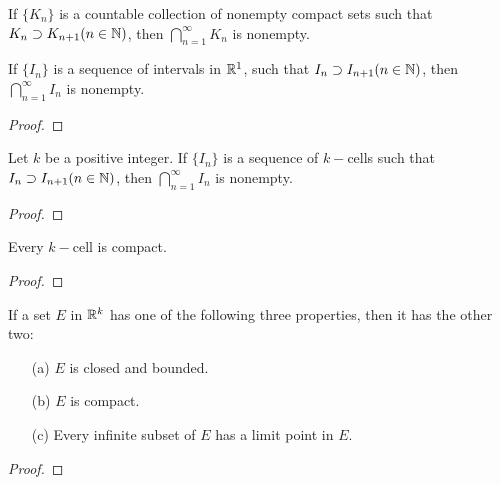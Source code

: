 \documentclass[11pt,a4paper]{book}
\begin{document}
\begin{corollary}
    If \( \{ {K}_{n} \}   \) is a countable collection of nonempty compact sets such that \( {K}_{n} \supset {K}_{n+1} (n \in \mathbb{N}) \), then \( \bigcap_{ n=1  }^{ \infty  } {K}_{n} \) is nonempty.
\end{corollary}

\begin{theorem}[ ]
    If \( \{ {I}_{n} \}  \) is a sequence of intervals in \( \mathbb{R}^{1} \), such that \( {I}_{n} \supset {I}_{n+1} (n \in \mathbb{N}) \), then \( \bigcap_{ n=1  }^{ \infty  }  {I}_{n} \) is nonempty. 
\end{theorem}
\begin{proof}

\end{proof}

\begin{theorem}[ ]
    Let \( k  \) be a positive integer. If \( \{ {I}_{n} \}  \) is a sequence of \( k- \)cells such that \( {I}_{n} \supset {I}_{n+1} (n \in \mathbb{N}) \), then \( \bigcap_{ n=1  }^{ \infty  } {I}_{n} \) is nonempty.
\end{theorem}
\begin{proof}

\end{proof}
\begin{theorem}[ ]
    Every \( k- \)cell is compact.
\end{theorem}
\begin{proof}

\end{proof}
\begin{theorem}[ ]
    If a set \( E  \) in \( \mathbb{R}^{k} \) has one of the following three properties, then it has the other two:
    \begin{enumerate}
        \item[(a)] \( E  \) is closed and bounded. 
        \item[(b)] \( E  \) is compact.
        \item[(c)] Every infinite subset of \( E  \) has a limit point in \( E  \).
    \end{enumerate}
\end{theorem}
\begin{proof}

\end{proof}
\end{document}
